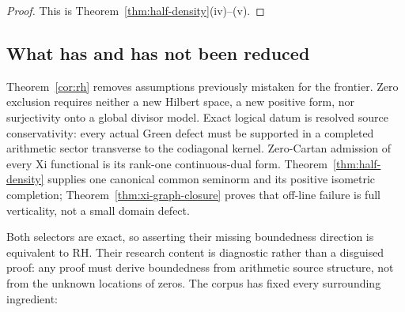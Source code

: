 \documentclass[11pt]{article}
\theoremstyle{definition}
\theoremstyle{remark}
\begin{document}
\begin{proof}
This is Theorem~\ref{thm:half-density}(iv)--(v).
\end{proof}

\subsection{What has and has not been reduced}

Theorem~\ref{cor:rh} removes assumptions previously mistaken for the
frontier.  Zero exclusion requires neither a new Hilbert space, a new
positive form, nor surjectivity onto a global divisor model.  Exact logical
datum is resolved source conservativity: every actual Green defect must be
supported in a completed arithmetic sector transverse to the codiagonal
kernel.  Zero-Cartan admission of every Xi functional is its rank-one
continuous-dual form.
Theorem~\ref{thm:half-density} supplies one canonical common seminorm and
its positive isometric completion; Theorem~\ref{thm:xi-graph-closure}
proves that off-line failure is full verticality, not a small domain defect.

Both selectors are exact, so asserting their missing boundedness direction
is equivalent to RH.  Their research content is diagnostic rather than a
disguised proof: any proof must derive boundedness from arithmetic source
structure, not from the unknown locations of zeros.  The corpus has fixed
every surrounding ingredient:
\end{document}
